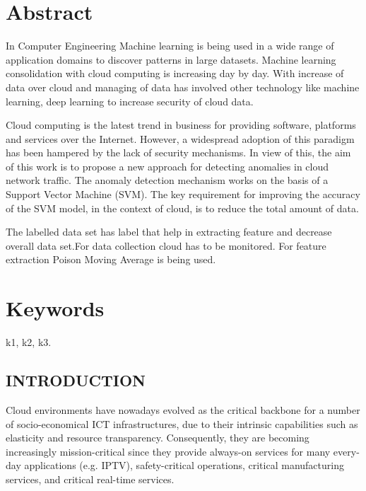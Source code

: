 \documentclass[a4paper, 12pt]{article}
\begin{document}
\newpage
\tableofcontents

\newpage
\listoftables
\listoffigures

\newpage

\section*{Abstract}
In Computer Engineering Machine learning is being used in a wide range of application domains to discover patterns in large datasets. Machine learning consolidation with cloud computing is increasing day by day. With increase of data over cloud and managing of data has involved other technology like machine learning, deep learning to increase security of cloud data.
\par 
Cloud computing is the latest trend in business for providing software, platforms and services over the Internet. However, a widespread adoption of this paradigm has been hampered by the lack of security mechanisms. In view of this, the aim of this work is to propose a new approach for detecting anomalies in cloud network traffic. The anomaly detection mechanism works on the basis of a Support Vector Machine (SVM). The key requirement for improving the accuracy of the SVM model, in the context of cloud, is to reduce the total amount of data.
\par
The labelled data set has label that help in extracting feature and decrease overall data set.For data collection cloud has to be monitored. For feature extraction Poison Moving Average is being used.  
\section*{Keywords}
k1, k2, k3.
\newpage
{}
\begin{center}
\section{INTRODUCTION}
\end{center}
\par
Cloud environments have nowadays evolved as the critical backbone for a number of socio-economical ICT infrastructures, due to their intrinsic capabilities such as elasticity and resource transparency. Consequently, they are becoming increasingly mission-critical since they provide always-on services for many every-day applications (e.g. IPTV), safety-critical operations, critical manufacturing services, and critical real-time services.
 \\ 
 
\end{document}

